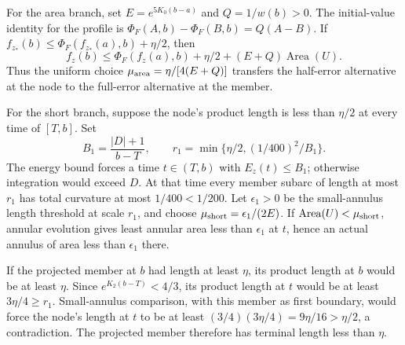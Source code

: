 \begin{lemma}\label{lem:annular-area-transfer}
For the area branch, set $E=e^{5K_0(b-a)}$ and $Q=1/w(b)>0$.
The initial-value identity for the profile is
$\Phi_F(A,b)-\Phi_F(B,b)=Q(A-B)$.  If
$f_{z_*}(b)\le\Phi_F(f_{z_*}(a),b)+\eta/2$, then
\[
 f_z(b)\le\Phi_F(f_z(a),b)+\eta/2
                   +(E+Q)\operatorname{Area}(U).
\]
Thus the uniform choice $\mu_{\rm area}=\eta/[4(E+Q)]$ transfers
the half-error alternative at the node to the full-error alternative
at the member.
\end{lemma}

\begin{lemma}\label{lem:annular-short-transfer}
For the short branch, suppose the node's product length is less than
$\eta/2$ at every time of $[T,b]$.  Set
\[
 B_1=\frac{|D|+1}{b-T},\qquad
 r_1=\min\{\eta/2,(1/400)^2/B_1\}.
\]
The energy bound forces a time $t\in(T,b)$ with $E_z(t)\le B_1$;
otherwise integration would exceed $D$.  At that time every member subarc
of length at most $r_1$ has total curvature at most $1/400<1/200$.
Let $\epsilon_1>0$ be the small-annulus length threshold at scale $r_1$,
and choose $\mu_{\rm short}=\epsilon_1/(2E)$.
If $\operatorname{Area}(U)<\mu_{\rm short}$, annular evolution gives
least annular area less than $\epsilon_1$ at $t$, hence an actual annulus
of area less than $\epsilon_1$ there.

If the projected member at $b$ had length at least $\eta$, its product
length at $b$ would be at least $\eta$.  Since
$e^{K_2(b-T)}<4/3$, its product length at $t$ would be at least
$3\eta/4\ge r_1$.  Small-annulus comparison, with this member as first
boundary, would force the node's length at $t$ to be at least
$(3/4)(3\eta/4)=9\eta/16>\eta/2$, a contradiction.  The projected member
therefore has terminal length less than $\eta$.
\end{lemma}

